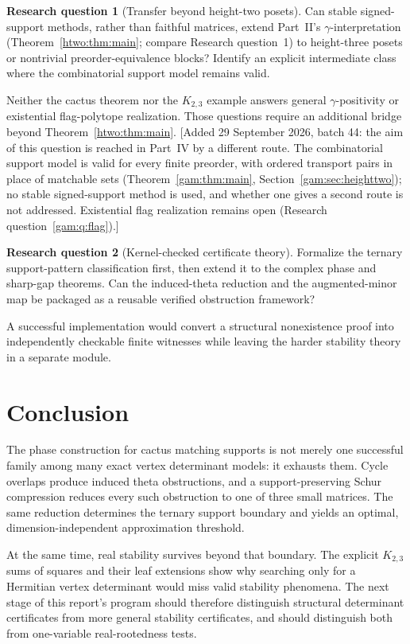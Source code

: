 \documentclass[11pt]{article}
\numberwithin{equation}{section}
\theoremstyle{definition}
\newtheorem{question}{Research question}%
\begin{document}
\begin{question}[Transfer beyond height-two posets]
Can stable signed-support methods, rather than faithful matrices, extend Part~II's $\gamma$-interpretation (Theorem~\ref{htwo:thm:main}; compare Research question~1) to height-three posets or nontrivial preorder-equivalence blocks? Identify an explicit intermediate class where the combinatorial support model remains valid.
\end{question}
Neither the cactus theorem nor the $K_{2,3}$ example answers general $\gamma$-positivity or existential flag-polytope realization. Those questions require an additional bridge beyond Theorem~\ref{htwo:thm:main}.
[Added 29 September 2026, batch 44: the aim of this question is reached in Part~IV by a different route. The combinatorial support model is valid for every finite preorder, with ordered transport pairs in place of matchable sets (Theorem~\ref{gam:thm:main}, Section~\ref{gam:sec:heighttwo}); no stable signed-support method is used, and whether one gives a second route is not addressed. Existential flag realization remains open (Research question~\ref{gam:q:flag}).]

\begin{question}[Kernel-checked certificate theory]
Formalize the ternary support-pattern classification first, then extend it to the complex phase and sharp-gap theorems. Can the induced-theta reduction and the augmented-minor map be packaged as a reusable verified obstruction framework?
\end{question}
A successful implementation would convert a structural nonexistence proof into independently checkable finite witnesses while leaving the harder stability theory in a separate module.

\section{Conclusion}\label{cac:sec:conclusion}
The phase construction for cactus matching supports is not merely one successful family among many exact vertex determinant models: it exhausts them. Cycle overlaps produce induced theta obstructions, and a support-preserving Schur compression reduces every such obstruction to one of three small matrices. The same reduction determines the ternary support boundary and yields an optimal, dimension-independent approximation threshold.

At the same time, real stability survives beyond that boundary. The explicit $K_{2,3}$ sums of squares and their leaf extensions show why searching only for a Hermitian vertex determinant would miss valid stability phenomena. The next stage of this report's program should therefore distinguish structural determinant certificates from more general stability certificates, and should distinguish both from one-variable real-rootedness tests.
\end{document}
